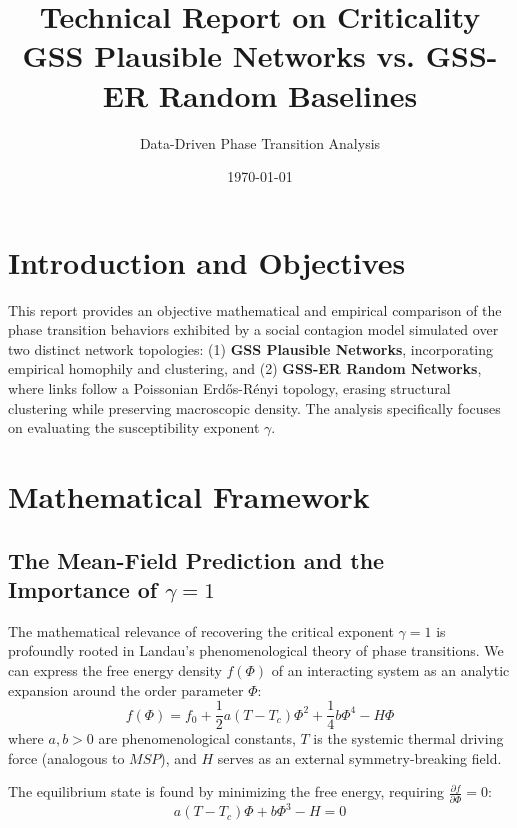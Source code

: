 \documentclass[11pt, a4paper]{article}
\title{Technical Report on Criticality \\ GSS Plausible Networks vs. GSS-ER Random Baselines}
\author{Data-Driven Phase Transition Analysis}
\date{\today}
\begin{document}
\maketitle

\section{Introduction and Objectives}
This report provides an objective mathematical and empirical comparison of the phase transition behaviors exhibited by a social contagion model simulated over two distinct network topologies: (1) \textbf{GSS Plausible Networks}, incorporating empirical homophily and clustering, and (2) \textbf{GSS-ER Random Networks}, where links follow a Poissonian Erd\H{o}s-R\'enyi topology, erasing structural clustering while preserving macroscopic density. The analysis specifically focuses on evaluating the susceptibility exponent $\gamma$.

\section{Mathematical Framework}

\subsection{The Mean-Field Prediction and the Importance of $\gamma = 1$}
The mathematical relevance of recovering the critical exponent $\gamma = 1$ is profoundly rooted in Landau's phenomenological theory of phase transitions. We can express the free energy density $f(\Phi)$ of an interacting system as an analytic expansion around the order parameter $\Phi$:
\begin{equation}
    f(\Phi) = f_0 + \frac{1}{2} a (T - T_c) \Phi^2 + \frac{1}{4} b \Phi^4 - H\Phi
\end{equation}
where $a, b > 0$ are phenomenological constants, $T$ is the systemic thermal driving force (analogous to $MSP$), and $H$ serves as an external symmetry-breaking field.

The equilibrium state is found by minimizing the free energy, requiring $\frac{\partial f}{\partial \Phi} = 0$:
\begin{equation}
    a(T - T_c)\Phi + b\Phi^3 - H = 0
\end{equation}
\end{document}
